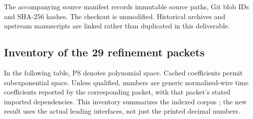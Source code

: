 The accompanying source manifest records immutable source paths, Git blob IDs and
SHA-256 hashes. The checkout is unmodified. Historical archives and upstream
manuscripts are linked rather than duplicated in this deliverable.

\subsection{Inventory of the 29 refinement packets}
In the following table, PS denotes polynomial space. Cached coefficients
permit subexponential space. Unless qualified, numbers are generic
normalized-wire time coefficients reported by the corresponding packet,
with that packet's stated imported dependencies. This inventory summarizes
the indexed corpus \cite{corpus}; the new result uses the actual leading
interfaces, not just the printed decimal numbers.

